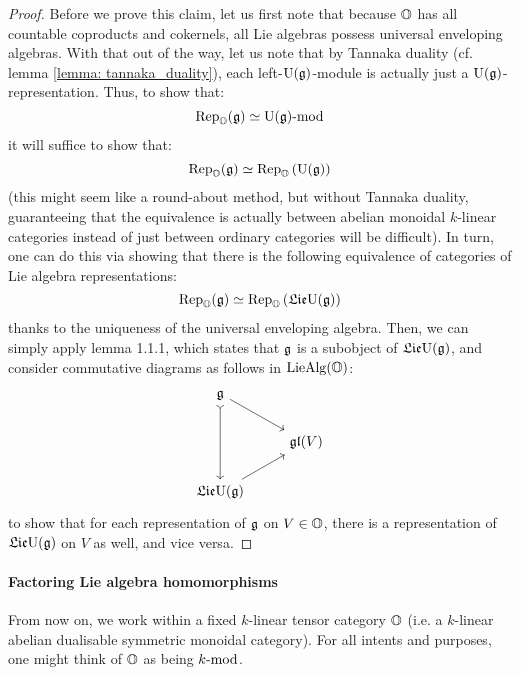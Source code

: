                         \begin{proof}
                            Before we prove this claim, let us first note that because $\O$ has all countable coproducts and cokernels, all Lie algebras possess universal enveloping algebras. With that out of the way, let us note that by Tannaka duality (cf. lemma \ref{lemma: tannaka_duality}), each left-$\U(\g)$-module is actually just a $\U(\g)$-representation. Thus, to show that:
                                $$\Rep_{\O}(\g) \cong {\U(\g)}\mod$$
                            it will suffice to show that:
                                $$\Rep_{\O}(\g) \cong \Rep_{\O}\left(\U(\g)\right)$$
                            (this might seem like a round-about method, but without Tannaka duality, guaranteeing that the equivalence is actually between abelian monoidal $k$-linear categories instead of just between ordinary categories will be difficult). In turn, one can do this via showing that there is the following equivalence of categories of Lie algebra representations:
                                $$\Rep_{\O}(\g) \cong \Rep_{\O}\left(\frakLie \U(\g)\right)$$
                            thanks to the uniqueness of the universal enveloping algebra. Then, we can simply apply lemma 1.1.1, which states that $\g$ is a subobject of $\frakLie \U(\g)$, and consider commutative diagrams as follows in $\Lie\Alg(\O)$:
                                $$
                                    \begin{tikzcd}
                                    	{\g} \\
                                    	& {\frakgl(V)} \\
                                    	{\frakLie \U(\g)}
                                    	\arrow[from=1-1, to=2-2]
                                    	\arrow[from=3-1, to=2-2]
                                    	\arrow[from=1-1, to=3-1, tail]
                                    \end{tikzcd}
                                $$
                            to show that for each representation of $\g$ on $V \in \O$, there is a representation of $\frakLie \U(\g)$ on $V$ as well, and vice versa.
                        \end{proof}
                    
                \paragraph{Factoring Lie algebra homomorphisms}
                    \begin{convention}
                        From now on, we work within a fixed $k$-linear tensor category $\O$ (i.e. a $k$-linear abelian dualisable symmetric monoidal category). For all intents and purposes, one might think of $\O$ as being $k\mod$.
                    \end{convention}
                    
